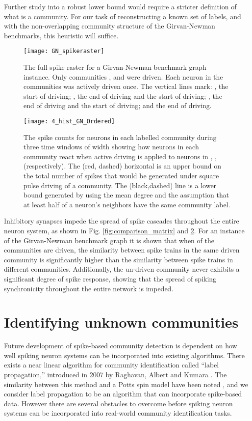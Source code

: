 \documentclass[sigconf]{acmart}
\begin{document}
Further study into a robust lower bound would require a stricter definition of what is a community. For our task of reconstructing a known set of labels, and with the non-overlapping community structure of the Girvan-Newman benchmarks, this heuristic will suffice.
\begin{figure}
\texttt{[image: GN\_spikeraster]}
\caption{The full spike raster for a Girvan-Newman benchmark graph instance. Only communities ,  and  were driven. Each neuron in the communities was actively driven once. The vertical lines mark: , the start of  driving; , the end of  driving and the start of  driving;  , the end of  driving and the start of  driving; and  the end of  driving.}
\label{fig:spike_raster}
\end{figure}
\begin{figure}
\texttt{[image: 4\_hist\_GN\_Ordered]}
\caption{The spike counts for neurons in each labelled community during three time windows of width  showing how neurons in each community react when active driving is applied to neurons in , ,  (respectively). The (red, dashed) horizontal is an upper bound on the total number of spikes that would be generated under square pulse driving of a  community. The (black,dashed) line is a lower bound generated by using the mean degree  and the assumption that at least half of a neuron's neighbors have the same community label.}
\label{fig:histogram}
\end{figure}
Inhibitory synapses impede the spread of spike cascades throughout the entire neuron system, as shown in Fig. \ref{fig:comparison_matrix} and \ref{fig:histogram}. For an instance of the Girvan-Newman benchmark graph it is shown that when  of the  communities are driven, the similarity between spike trains in the same driven community is significantly higher than the similarity between spike trains in different communities. Additionally, the un-driven community never exhibits a significant degree of spike response, showing that the spread of spiking synchronicity throughout the entire network is impeded. 

\section{Identifying unknown communities}
\label{sec:future_work}
Future development of spike-based community detection is dependent on how well spiking neuron systems can be incorporated into existing algorithms. There exists a near linear algorithm for community identification called ``label propagation,'' introduced in 2007 by Raghavan, Albert and Kumara \cite{raghavan2007near}. The similarity between this method and a Potts spin model have been noted \cite{tibely2008equivalence}, and we consider label propagation to be an algorithm that can incorporate spike-based data. However there are several obstacles to overcome before spiking neuron systems can be incorporated into real-world community identification tasks. 
\end{document}
